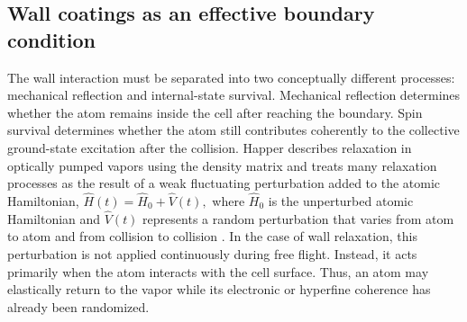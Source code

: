 \subsection{Wall coatings as an effective boundary condition}
\label{subsec:wall_coatings}



The wall interaction must be separated into two conceptually different processes: mechanical reflection and internal-state survival. Mechanical reflection determines whether the atom remains inside the cell after reaching the boundary. Spin survival determines whether the atom still contributes coherently to the collective ground-state excitation after the collision. Happer describes relaxation in optically pumped vapors using the density matrix and treats many relaxation processes as the result of a weak fluctuating perturbation added to the atomic Hamiltonian,
     $
     \hat{H}(t) = \hat{H}_0 + \hat{V}(t),
    \label{eq:weak_fluctuation_hamiltonian}
    $
where \(\hat{H}_0\) is the unperturbed atomic Hamiltonian and \(\hat{V}(t)\) represents a random perturbation that varies from atom to atom and from collision to collision \cite{OP_Happer_1972}. In the case of wall relaxation, this perturbation is not applied continuously during free flight. Instead, it acts primarily when the atom interacts with the cell surface. Thus, an atom may elastically return to the vapor while its electronic or hyperfine coherence has already been randomized.

